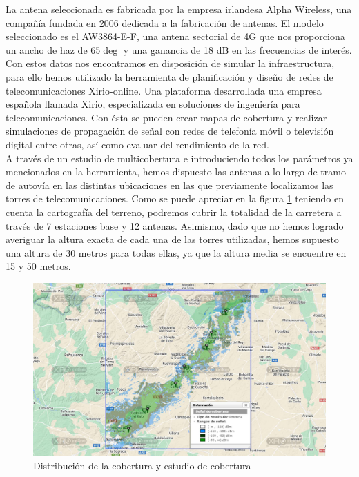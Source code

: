 La antena seleccionada es fabricada por la empresa irlandesa Alpha Wireless, una compañía fundada en 2006 dedicada a la fabricación de antenas. El modelo seleccionado es el AW3864-E-F, una antena sectorial de 4G que nos proporciona un ancho de haz de 65$\deg$ y una ganancia de 18 dB en las frecuencias de interés.\\

Con estos datos nos encontramos en disposición de simular la infraestructura, para ello hemos utilizado la herramienta de planificación y diseño de redes de telecomunicaciones Xirio-online. Una plataforma desarrollada una empresa española llamada Xirio, especializada en soluciones de ingeniería para telecomunicaciones. Con ésta se pueden crear mapas de cobertura y realizar simulaciones de propagación de señal con redes de telefonía móvil o televisión digital entre otras, así como evaluar del rendimiento de la red.\\

A través de un estudio de multicobertura e introduciendo todos los parámetros ya mencionados en la herramienta, hemos dispuesto las antenas a lo largo de tramo de autovía en las distintas ubicaciones en las que previamente localizamos las torres de telecomunicaciones. Como se puede apreciar en la figura \ref{xirio} teniendo en cuenta la cartografía del terreno, podremos cubrir la totalidad de la carretera a través de 7 estaciones base y 12 antenas. Asimismo, dado que no hemos logrado averiguar la altura exacta de cada una de las torres utilizadas, hemos supuesto una altura de 30 metros para todas ellas, ya que la altura media se encuentre en 15 y 50 metros.

\begin{figure}[H]
\centering
\includegraphics[width=\textwidth]{Imagenes/Solucion/xirio.pdf}
\caption{Distribución de la cobertura y estudio de cobertura}
\label{xirio}
\end{figure}

